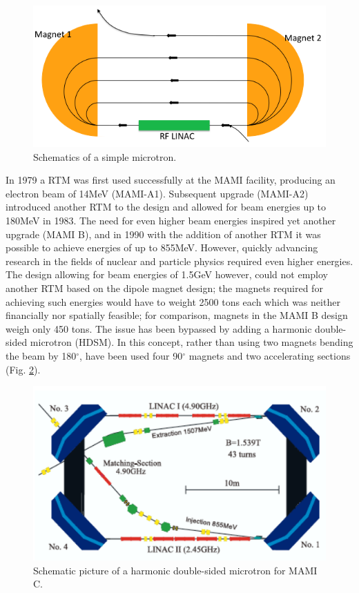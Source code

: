 \begin{figure}[H]
\begin{center}
\includegraphics[scale=0.65]{pictures/png/rfm.png}
\caption{Schematics of a simple microtron.}
\label{microtronplot}
\end{center}
\end{figure}

In 1979 a RTM was first used successfully at the MAMI facility, producing an electron beam of 14MeV (MAMI-A1). Subsequent upgrade (MAMI-A2) introduced another RTM to the design and allowed for beam energies up to 180MeV in 1983. The need for even higher beam energies inspired yet another upgrade (MAMI B), and in 1990 with the addition of another RTM it was possible to achieve energies of up to 855MeV. However, quickly advancing research in the fields of nuclear and particle physics required even higher energies. The design allowing for beam energies of 1.5GeV however, could not employ another RTM based on the dipole magnet design; the magnets required for achieving such energies would have to weight 2500 tons each which was neither financially nor spatially feasible; for comparison, magnets in the MAMI B design weigh only 450 tons. The issue has been bypassed by adding a harmonic double-sided microtron (HDSM). In this concept, rather than using two magnets bending the beam by 180$^{\circ}$, have been used four 90$^{\circ}$ magnets and two accelerating sections (Fig. \ref{mamic}). 

\begin{figure}[H]
\begin{center}
\includegraphics[scale=0.25]{pictures/png/HDSM.png}
\caption{Schematic picture of a harmonic double-sided microtron for MAMI C.}
\label{mamic}
\end{center}
\end{figure}

